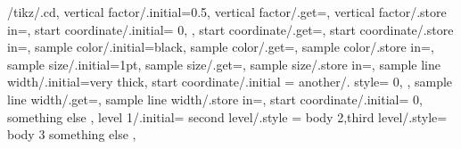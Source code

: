 \pgfkeys
{
	/tikz/.cd,
	vertical factor/.initial=0.5,
	vertical factor/.get=\vertfactor,
	vertical factor/.store in=\vertfactor,
	start coordinate/.initial=
		{
			0,\vertfactor
		}
	,
	start coordinate/.get=\startcoord,
	start coordinate/.store in=\startcoord,
	sample color/.initial=black,
	sample color/.get=\samplecol,
	sample color/.store in=\samplecol,
	sample size/.initial=1pt,
	sample size/.get=\samplesize,
	sample size/.store in=\samplesize,
	sample line width/.initial=very thick,
	start coordinate/.initial =
		{
			another/. style=
				{
					0,\vertfactor
				}
		}
	,
	sample line width/.get=\samplelinewidth,
	sample line width/.store in=\samplelinewidth,
	start coordinate/.initial=
		{
			0,\vertfactor
		}
		{
			something else
		}
	,
	level 1/.initial=
		{
			second level/.style =
				{
					body 2,third level/.style=
						{
							body 3
						}
				}
		}
		{
			something else
		}
	,
}
